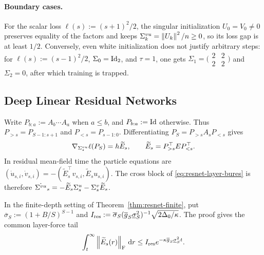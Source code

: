 \paragraph{Boundary cases.}
For the scalar loss $\ell(s):=(s+1)^2/2$, the singular initialization
$U_0=V_0\ne0$ preserves equality of the factors and keeps
$\Sigma^{vu}_k=\left\lVert U_k \right\rVert^2/n\ge0$, so its loss gap is at least $1/2$.
Conversely, even white initialization does not justify arbitrary steps:
for $\ell(s):=(s-1)^2/2$, $\Sigma_0=\mathrm{Id}_2$, and $\tau=1$, one gets
$\Sigma_1=\bigl(\begin{smallmatrix}2&2\\2&2\end{smallmatrix}\bigr)$
and $\Sigma_2=0$, after which training is trapped.

\subsection{Deep Linear Residual Networks}\label{app:resnets}
Write
$P_{b:a}:=A_b\cdots A_a$ when $a\le b$, and $P_{b:a}:=\mathrm{Id}$ otherwise.
Thus $P_{>s}=P_{S-1:s+1}$ and $P_{<s}=P_{s-1:0}$.
Differentiating $P_S=P_{>s}A_sP_{<s}$ gives
\begin{equation}
  \label{eq:resnet-layer-gradient}
\nabla_{\Sigma^{vu}_s}\ell(P_S)
=h\widetilde E_s,
\qquad
\widetilde E_s=P_{>s}^\top E P_{<s}^\top.
\end{equation}
In residual mean-field time the particle equations are
$(\dot u_{s,i},\dot v_{s,i})
=-(\widetilde E_s^\top v_{s,i},\widetilde E_su_{s,i})$.
The cross block of \eqref{eq:resnet-layer-bures} is therefore
$\dot{\Sigma^{vu}}_s=-\widetilde E_s\Sigma^u_s-\Sigma^v_s\widetilde E_s$.

In the finite-depth setting of Theorem~\ref{thm:resnet-finite}, put
$\overline{\sigma}_S:=(1+B/S)^{S-1}$ and
$I_{\rm res}:=\overline{\sigma}_S(\overline g_S\underline{\sigma}_S^2)^{-1}\sqrt{2\Delta_0/\kappa}$.
The proof gives the common layer-force tail
\begin{equation}\label{eq:resnet-length}
 \int_t^\infty\left\lVert \widetilde E_s(r) \right\rVert_{\mathrm{F}}\,\mathrm{d} r
 \le I_{\rm res}e^{-\kappa\overline g_S\underline{\sigma}_S^2t}.
\end{equation}

